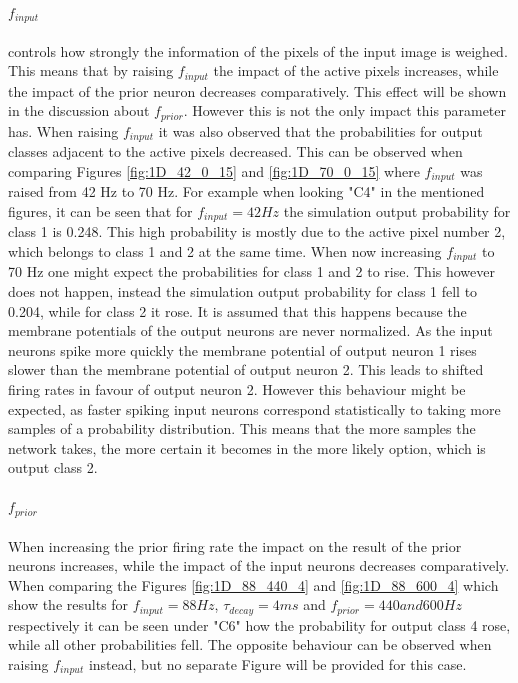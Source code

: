\paragraph{$f_{input}$} controls how strongly the information of the pixels of the input image is weighed. This means that by raising $f_{input}$ the impact of the active pixels increases, while the impact of the prior neuron decreases comparatively. This effect will be shown in the discussion about $f_{prior}$. However this is not the only impact this parameter has. When raising $f_{input}$ it was also observed that the probabilities for output classes adjacent to the active pixels decreased. This can be observed when comparing Figures \ref{fig:1D_42_0_15} and \ref{fig:1D_70_0_15} where $f_{input}$ was raised from 42 Hz to 70 Hz. For example when looking "C4" in the mentioned figures, it can be seen that for $f_{input} = 42 Hz$ the simulation output probability for class 1 is 0.248. This high probability is mostly due to the active pixel number 2, which belongs to class 1 and 2 at the same time. When now increasing $f_{input}$ to 70 Hz one might expect the probabilities for class 1 and 2 to rise. This however does not happen, instead the simulation output probability for class 1 fell to 0.204, while for class 2 it rose.
It is assumed that this happens because the membrane potentials of the output neurons are never normalized. As the input neurons spike more quickly the membrane potential of output neuron 1 rises slower than the membrane potential of output neuron 2. This leads to shifted firing rates in favour of output neuron 2. However this behaviour might be expected, as faster spiking input neurons correspond statistically to taking more samples of a probability distribution. This means that the more samples the network takes, the more certain it becomes in the more likely option, which is output class 2.

\paragraph{$f_{prior}$} When increasing the prior firing rate the impact on the result of the prior neurons increases, while the impact of the input neurons decreases comparatively. When comparing the Figures \ref{fig:1D_88_440_4} and \ref{fig:1D_88_600_4} which show the results for $f_{input} = 88 Hz$, $\tau_{decay} = 4 ms$ and $f_{prior} = 440 and 600 Hz$ respectively it can be seen under "C6" how the probability for output class 4 rose, while all other probabilities fell. The opposite behaviour can be observed when raising $f_{input}$ instead, but no separate Figure will be provided for this case.

